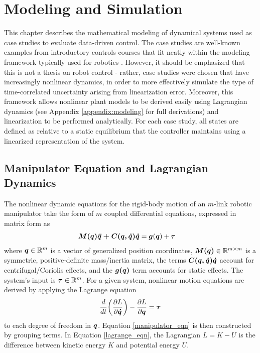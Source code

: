 \chapter{Modeling and Simulation}
\label{chap:model}
This chapter describes the mathematical modeling of dynamical systems used as case studies to evaluate data-driven control.  The case studies are well-known examples from introductory controls courses that fit neatly within the modeling framework typically used for robotics \cite{slotineli, sciavicco2001modelling, spong2008robot}.  However, it should be emphasized that this is not a thesis on robot control - rather, case studies were chosen that have increasingly nonlinear dynamics, in order to more effectively simulate the type of time-correlated uncertainty arising from linearization error.  Moreover, this framework allows nonlinear plant models to be derived easily using Lagrangian dynamics (see Appendix \ref{appendix:modeling} for full derivations) and linearization to be performed analytically.  For each case study, all states are defined as relative to a static equilibrium that the controller maintains using a linearized representation of the system.

\section{Manipulator Equation and Lagrangian Dynamics}
The nonlinear dynamic equations for the rigid-body motion of an $m$-link robotic manipulator take the form of $m$ coupled differential equations, expressed in matrix form as
\begin{equation}
\label{manipulator_eqn}
\begin{aligned}
	\vb*{M(q)\ddot{q} + C(q, \dot{q})\dot{q}} &= \vb*{g}(\vb*{q}) + \vb*{\tau}
\end{aligned}
\end{equation}
where $\vb*{q} \in \mathbb{R}^{m}$ is a vector of generalized position coordinates, $\vb*{M(q)} \in \mathbb{R}^{m \times m}$ is a symmetric, positive-definite mass/inertia matrix, the terms $\vb*{C(q, \dot{q})\dot{q}}$ account for centrifugal/Coriolis effects, and the $\vb*{g(q)}$ term accounts for static effects.  The system's input is $\vb*{\tau} \in \mathbb{R}^{m}$.  For a given system, nonlinear motion equations are derived by applying the Lagrange equation
\begin{equation}
\label{lagrange_eqn}
\begin{aligned}
	\frac{d}{dt} \bigg{(} \frac{\partial L}{\partial \vb*{\dot{q}} } \bigg{)} - \frac{\partial L}{\partial \vb*{q}} = \vb*{\tau}
\end{aligned}
\end{equation}
to each degree of freedom in $\vb*{q}$.  Equation \eqref{manipulator_eqn} is then constructed by grouping terms.  In Equation \eqref{lagrange_eqn}, the Lagrangian $L = K - U$ is the difference between kinetic energy $K$ and potential energy $U$.

